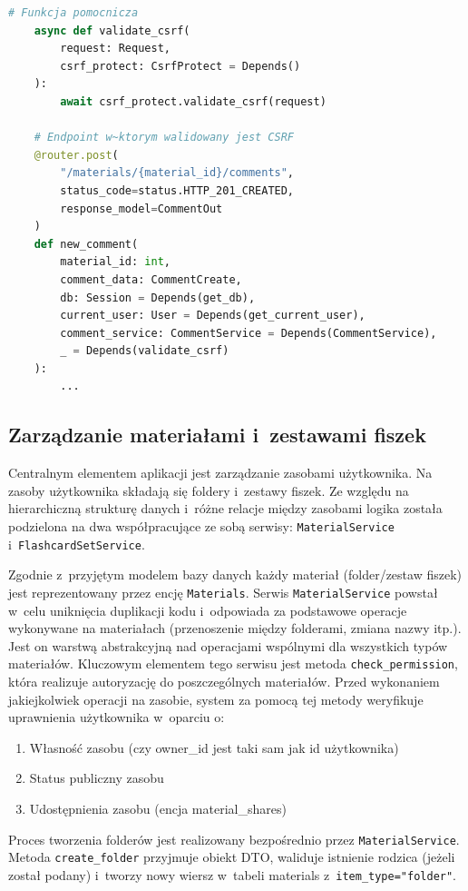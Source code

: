 \begin{lstlisting}[language=Python,
	caption={Asynchroniczna zależność w~synchronicznym endpoincie},
	label={lst:async_in_sync}]
    # Funkcja pomocnicza
    async def validate_csrf(
        request: Request, 
        csrf_protect: CsrfProtect = Depends()
    ):
        await csrf_protect.validate_csrf(request)

    # Endpoint w~ktorym walidowany jest CSRF
    @router.post(
        "/materials/{material_id}/comments", 
        status_code=status.HTTP_201_CREATED, 
        response_model=CommentOut
    )
    def new_comment(
        material_id: int, 
        comment_data: CommentCreate, 
        db: Session = Depends(get_db), 
        current_user: User = Depends(get_current_user),
        comment_service: CommentService = Depends(CommentService),
        _ = Depends(validate_csrf)
    ):
        ...
\end{lstlisting} 
 
\subsection{Zarządzanie materiałami i~zestawami fiszek}
Centralnym elementem aplikacji jest zarządzanie zasobami użytkownika. Na zasoby użytkownika składają się foldery i~zestawy fiszek. Ze względu 
na hierarchiczną strukturę danych i~różne relacje między zasobami logika została podzielona na dwa współpracujące ze sobą serwisy: 
\texttt{MaterialService} i~\texttt{FlashcardSetService}.

Zgodnie z~przyjętym modelem bazy danych każdy materiał (folder/zestaw fiszek) jest reprezentowany przez encję \texttt{Materials}. Serwis 
\texttt{MaterialService} powstał w~celu uniknięcia duplikacji kodu i~odpowiada za podstawowe operacje wykonywane na materiałach 
(przenoszenie między folderami, zmiana nazwy itp.). Jest on warstwą abstrakcyjną nad operacjami wspólnymi dla wszystkich typów materiałów. 
Kluczowym elementem tego serwisu jest metoda 
\texttt{check\_permission}, która realizuje autoryzację do poszczególnych materiałów. Przed wykonaniem jakiejkolwiek operacji na zasobie, 
system za pomocą tej metody weryfikuje uprawnienia użytkownika w~oparciu o:
\begin{enumerate}
    \item Własność zasobu (czy owner\_id jest taki sam jak id użytkownika)
    \item Status publiczny zasobu
    \item Udostępnienia zasobu (encja material\_shares)
\end{enumerate} 
Proces tworzenia folderów jest realizowany bezpośrednio przez \texttt{MaterialService}. Metoda \texttt{create\_folder} przyjmuje obiekt DTO, 
waliduje istnienie rodzica (jeżeli został podany) i~tworzy nowy wiersz w~tabeli materials z~\texttt{item\_type="folder"}.  


